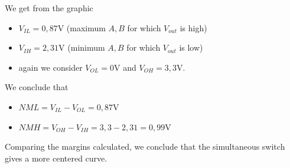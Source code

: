 \documentclass[../main.tex]{subfiles}
\begin{document}
{{		We get from the graphic
		
		\begin{itemize}
			\item $V_{IL} = 0,87$V (maximum $A,B$ for which $V_{out}$ is high)
			\item $V_{IH} = 2,31$V (minimum $A,B$ for which $V_{out}$ is low)
			\item again we consider $V_{OL} = 0$V and $V_{OH} = 3,3$V.
		\end{itemize}
		
		We conclude that
		\begin{itemize}
			\item $NML = V_{IL} - V_{OL} = 0,87$V
			\item $NMH = V_{OH} - V_{IH} = 3,3 - 2,31 = 0,99$V
		\end{itemize}
		
		Comparing the margins calculated, we conclude that the simultaneous switch gives a more centered curve.
	}
	
	}
\end{document}
